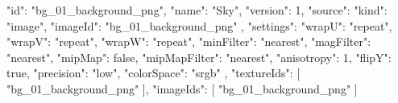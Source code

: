 {
  "id": "bg_01_background_png",
  "name": "Sky",
  "version": 1,
  "source": {
    "kind": "image",
    "imageId": "bg_01_background_png"
  },
  "settings": {
    "wrapU": "repeat",
    "wrapV": "repeat",
    "wrapW": "repeat",
    "minFilter": "nearest",
    "magFilter": "nearest",
    "mipMap": false,
    "mipMapFilter": "nearest",
    "anisotropy": 1,
    "flipY": true,
    "precision": "low",
    "colorSpace": "srgb"
  },
  "textureIds": [
    "bg_01_background_png"
  ],
  "imageIds": [
    "bg_01_background_png"
  ]
}
